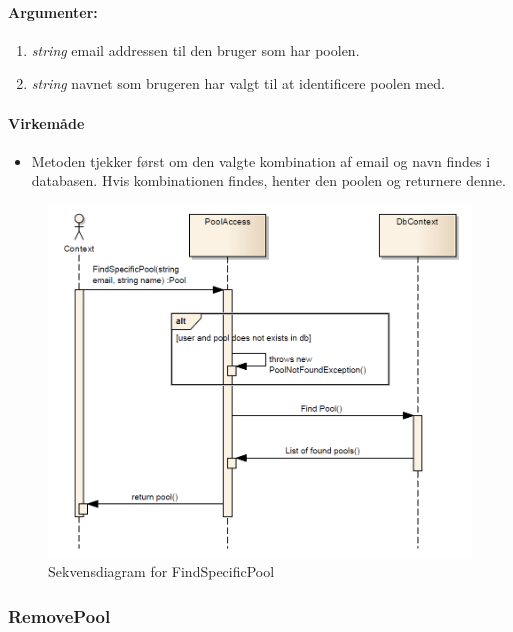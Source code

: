 \paragraph{Argumenter:}
\begin{enumerate}
	\item \textit{string} email addressen til den bruger som har poolen.
	\item \textit{string} navnet som brugeren har valgt til at identificere poolen med.
\end{enumerate}

\paragraph{Virkemåde}
\begin{itemize}
	\item Metoden tjekker først om den valgte kombination af email og navn findes i databasen. Hvis kombinationen findes, henter den poolen og returnere denne.
\end{itemize}

\begin{figure}
\centering
\includegraphics[width=\linewidth]{figs/dbSeq/findSpecificPool}
\caption{Sekvensdiagram for FindSpecificPool}
\label{fig:findSpecificPool}
\end{figure}




\subsubsection{RemovePool}%

